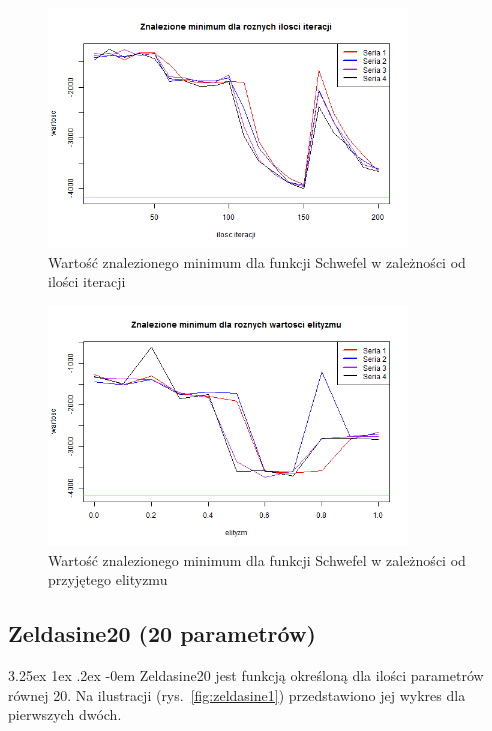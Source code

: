 \documentclass[11pt, a4paper]{article}
\makeatletter
\renewcommand\paragraph{\@startsection{paragraph}{5}{\z@}
  {3.25ex \@plus1ex \@minus.2ex}
  {-0em}
  {\normalfont\normalsize\bfseries}}
\makeatother
\begin{document}
\begin{figure}[H]
	\begin{center}
		\includegraphics[width=0.85\textwidth]{./assets/Schwefel5.png}
		\caption{Wartość znalezionego minimum dla funkcji Schwefel w zależności od ilości iteracji}
		\label{fig:schwefel5}
	\end{center}
\end{figure}

\begin{figure}[H]
	\begin{center}
		\includegraphics[width=0.85\textwidth]{./assets/Schwefel6.png}
		\caption{Wartość znalezionego minimum dla funkcji Schwefel w zależności od przyjętego elityzmu}
		\label{fig:schwefel6}
	\end{center}
\end{figure}

\newpage
\subsection{Zeldasine20 (20 parametrów)}
\paragraph{}
Zeldasine20 jest funkcją określoną dla ilości parametrów równej 20. Na ilustracji (rys.~\ref{fig:zeldasine1}) przedstawiono jej wykres dla pierwszych dwóch.
\end{document}
